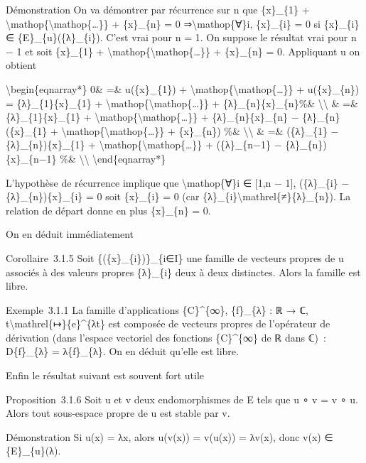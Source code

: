 \documentclass[]{article}
\begin{document}
Démonstration On va démontrer par récurrence sur n que \{x\}\_\{1\} +
\textbackslash{}mathop\{\textbackslash{}mathop\{\ldots{}\}\} +
\{x\}\_\{n\} = 0 ⇒\textbackslash{}mathop\{∀\}i, \{x\}\_\{i\} = 0 si
\{x\}\_\{i\} ∈ \{E\}\_\{u\}(\{λ\}\_\{i\}). C'est vrai pour n = 1. On
suppose le résultat vrai pour n − 1 et soit \{x\}\_\{1\} +
\textbackslash{}mathop\{\textbackslash{}mathop\{\ldots{}\}\} +
\{x\}\_\{n\} = 0. Appliquant u on obtient

\textbackslash{}begin\{eqnarray*\} 0\& =\& u(\{x\}\_\{1\}) +
\textbackslash{}mathop\{\textbackslash{}mathop\{\ldots{}\}\} +
u(\{x\}\_\{n\}) = \{λ\}\_\{1\}\{x\}\_\{1\} +
\textbackslash{}mathop\{\textbackslash{}mathop\{\ldots{}\}\} +
\{λ\}\_\{n\}\{x\}\_\{n\}\%\& \textbackslash{}\textbackslash{} \& =\&
\{λ\}\_\{1\}\{x\}\_\{1\} +
\textbackslash{}mathop\{\textbackslash{}mathop\{\ldots{}\}\} +
\{λ\}\_\{n\}\{x\}\_\{n\} − \{λ\}\_\{n\}(\{x\}\_\{1\} +
\textbackslash{}mathop\{\textbackslash{}mathop\{\ldots{}\}\} +
\{x\}\_\{n\}) \%\& \textbackslash{}\textbackslash{} \& =\& (\{λ\}\_\{1\}
− \{λ\}\_\{n\})\{x\}\_\{1\} +
\textbackslash{}mathop\{\textbackslash{}mathop\{\ldots{}\}\} +
(\{λ\}\_\{n−1\} − \{λ\}\_\{n\})\{x\}\_\{n−1\} \%\&
\textbackslash{}\textbackslash{} \textbackslash{}end\{eqnarray*\}

L'hypothèse de récurrence implique que \textbackslash{}mathop\{∀\}i ∈
{[}1,n − 1{]}, (\{λ\}\_\{i\} − \{λ\}\_\{n\})\{x\}\_\{i\} = 0 soit
\{x\}\_\{i\} = 0 (car
\{λ\}\_\{i\}\textbackslash{}mathrel\{≠\}\{λ\}\_\{n\}). La relation de
départ donne en plus \{x\}\_\{n\} = 0.

On en déduit immédiatement

Corollaire~3.1.5 Soit \{(\{x\}\_\{i\})\}\_\{i∈I\} une famille de
vecteurs propres de u associés à des valeurs propres \{λ\}\_\{i\} deux à
deux distinctes. Alors la famille est libre.

Exemple~3.1.1 La famille d'applications \{C\}\^{}\{∞\}, \{f\}\_\{λ\} : ℝ
→ ℂ, t\textbackslash{}mathrel\{↦\}\{e\}\^{}\{λt\} est composée de
vecteurs propres de l'opérateur de dérivation (dans l'espace vectoriel
des fonctions \{C\}\^{}\{∞\} de ℝ dans ℂ)~: D\{f\}\_\{λ\} =
λ\{f\}\_\{λ\}. On en déduit qu'elle est libre.

Enfin le résultat suivant est souvent fort utile

Proposition~3.1.6 Soit u et v deux endomorphismes de E tels que u ∘ v =
v ∘ u. Alors tout sous-espace propre de u est stable par v.

Démonstration Si u(x) = λx, alors u(v(x)) = v(u(x)) = λv(x), donc v(x) ∈
\{E\}\_\{u\}(λ).
\end{document}
